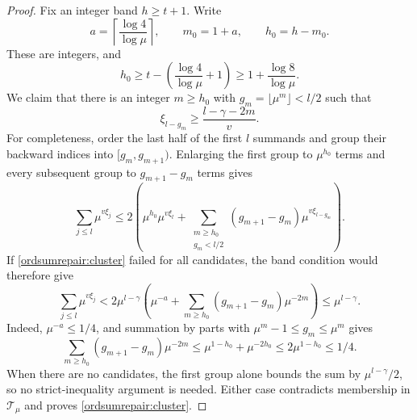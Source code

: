 \begin{proof}
Fix an integer band $h\geq t+1$. Write
\[
 a=\left\lceil\frac{\log4}{\log\mu}\right\rceil,\qquad
 m_0=1+a,\qquad h_0=h-m_0.
\]
These are integers, and
\begin{equation}
 h_0\geq t-\left(\frac{\log4}{\log\mu}+1\right)
       \geq1+\frac{\log8}{\log\mu}.
 \label{ordsumrepair:h0}
\end{equation}
We claim that there is an integer $m\geq h_0$ with
$g_m=\lfloor\mu^m\rfloor<l/2$ such that
\begin{equation}
 \xi_{l-g_m}\geq\frac{l-\gamma-2m}{v}.
 \label{ordsumrepair:cluster}
\end{equation}
For completeness, order the last half of the first $l$ summands and
group their backward indices into $[g_m,g_{m+1})$. Enlarging the first
group to $\mu^{h_0}$ terms and every subsequent group to
$g_{m+1}-g_m$ terms gives
\[
 \sum_{j\leq l}\mu^{v\xi_j}
 \leq2\left(\mu^{h_0}\mu^{v\xi_l}
       +\sum_{\substack{m\geq h_0\\g_m<l/2}}
            (g_{m+1}-g_m)\mu^{v\xi_{l-g_m}}\right).
\]
If \eqref{ordsumrepair:cluster} failed for all candidates, the
band condition would therefore give
\[
 \sum_{j\leq l}\mu^{v\xi_j}
 <2\mu^{l-\gamma}\left(\mu^{-a}
           +\sum_{m\geq h_0}(g_{m+1}-g_m)\mu^{-2m}\right)
 \leq\mu^{l-\gamma}.
\]
Indeed, $\mu^{-a}\leq1/4$, and summation by parts with
$\mu^m-1\leq g_m\leq\mu^m$ gives
\[
 \sum_{m\geq h_0}(g_{m+1}-g_m)\mu^{-2m}
 \leq\mu^{1-h_0}+\mu^{-2h_0}
 \leq2\mu^{1-h_0}\leq1/4.
\]
When there are no candidates, the first group alone bounds the sum
by $\mu^{l-\gamma}/2$, so no strict-inequality argument is needed.
Either case contradicts membership in $\mathcal T_\mu$ and proves
\eqref{ordsumrepair:cluster}.


\end{proof}
